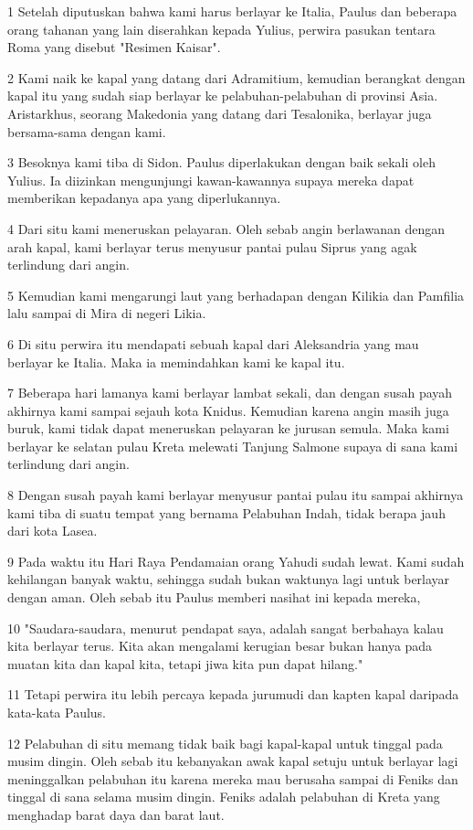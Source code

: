 \par 1 Setelah diputuskan bahwa kami harus berlayar ke Italia, Paulus dan beberapa orang tahanan yang lain diserahkan kepada Yulius, perwira pasukan tentara Roma yang disebut "Resimen Kaisar".
\par 2 Kami naik ke kapal yang datang dari Adramitium, kemudian berangkat dengan kapal itu yang sudah siap berlayar ke pelabuhan-pelabuhan di provinsi Asia. Aristarkhus, seorang Makedonia yang datang dari Tesalonika, berlayar juga bersama-sama dengan kami.
\par 3 Besoknya kami tiba di Sidon. Paulus diperlakukan dengan baik sekali oleh Yulius. Ia diizinkan mengunjungi kawan-kawannya supaya mereka dapat memberikan kepadanya apa yang diperlukannya.
\par 4 Dari situ kami meneruskan pelayaran. Oleh sebab angin berlawanan dengan arah kapal, kami berlayar terus menyusur pantai pulau Siprus yang agak terlindung dari angin.
\par 5 Kemudian kami mengarungi laut yang berhadapan dengan Kilikia dan Pamfilia lalu sampai di Mira di negeri Likia.
\par 6 Di situ perwira itu mendapati sebuah kapal dari Aleksandria yang mau berlayar ke Italia. Maka ia memindahkan kami ke kapal itu.
\par 7 Beberapa hari lamanya kami berlayar lambat sekali, dan dengan susah payah akhirnya kami sampai sejauh kota Knidus. Kemudian karena angin masih juga buruk, kami tidak dapat meneruskan pelayaran ke jurusan semula. Maka kami berlayar ke selatan pulau Kreta melewati Tanjung Salmone supaya di sana kami terlindung dari angin.
\par 8 Dengan susah payah kami berlayar menyusur pantai pulau itu sampai akhirnya kami tiba di suatu tempat yang bernama Pelabuhan Indah, tidak berapa jauh dari kota Lasea.
\par 9 Pada waktu itu Hari Raya Pendamaian orang Yahudi sudah lewat. Kami sudah kehilangan banyak waktu, sehingga sudah bukan waktunya lagi untuk berlayar dengan aman. Oleh sebab itu Paulus memberi nasihat ini kepada mereka,
\par 10 "Saudara-saudara, menurut pendapat saya, adalah sangat berbahaya kalau kita berlayar terus. Kita akan mengalami kerugian besar bukan hanya pada muatan kita dan kapal kita, tetapi jiwa kita pun dapat hilang."
\par 11 Tetapi perwira itu lebih percaya kepada jurumudi dan kapten kapal daripada kata-kata Paulus.
\par 12 Pelabuhan di situ memang tidak baik bagi kapal-kapal untuk tinggal pada musim dingin. Oleh sebab itu kebanyakan awak kapal setuju untuk berlayar lagi meninggalkan pelabuhan itu karena mereka mau berusaha sampai di Feniks dan tinggal di sana selama musim dingin. Feniks adalah pelabuhan di Kreta yang menghadap barat daya dan barat laut.
